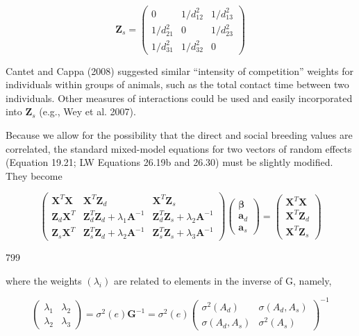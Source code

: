 \documentclass{article}
\begin{document}
\begin{equation}
\mathbf{Z}_{s}=\begin{pmatrix}0&1/d_{12}^{2}&1/d_{13}^{2}\\1/d_{21}^{2}&0&1/d_{23}^{2}\\1/d_{31}^{2}&1/d_{32}^{2}&0\end{pmatrix}
\end{equation}

Cantet and Cappa (2008) suggested similar “intensity of competition” weights for individuals within groups of animals, such as the total contact time between two individuals. Other measures of interactions could be used and easily incorporated into  $ \mathbf{Z}_{s} $ (e.g., Wey et al. 2007).

Because we allow for the possibility that the direct and social breeding values are correlated, the standard mixed-model equations for two vectors of random effects (Equation 19.21; LW Equations 26.19b and 26.30) must be slightly modified. They become

\begin{equation}
\begin{pmatrix}\mathbf{X}^{T}\mathbf{X}&\mathbf{X}^{T}\mathbf{Z}_{d}&\mathbf{X}^{T}\mathbf{Z}_{s}\\\mathbf{Z}_{d}\mathbf{X}^{T}&\mathbf{Z}_{d}^{T}\mathbf{Z}_{d}+\lambda_{1}\mathbf{A}^{-1}&\mathbf{Z}_{d}^{T}\mathbf{Z}_{s}+\lambda_{2}\mathbf{A}^{-1}\\\mathbf{Z}_{s}\mathbf{X}^{T}&\mathbf{Z}_{s}^{T}\mathbf{Z}_{d}+\lambda_{2}\mathbf{A}^{-1}&\mathbf{Z}_{s}^{T}\mathbf{Z}_{s}+\lambda_{3}\mathbf{A}^{-1}\end{pmatrix}\begin{pmatrix}\boldsymbol{\beta}\\\mathbf{a}_{d}\\\mathbf{a}_{s}\end{pmatrix}=\begin{pmatrix}\mathbf{X}^{T}\mathbf{X}\\\mathbf{X}^{T}\mathbf{Z}_{d}\\\mathbf{X}^{T}\mathbf{Z}_{s}\end{pmatrix}
\tag{22.40a}
\label{eq:22_40a}
\end{equation}

799

where the weights  $ \left(\lambda_{i}\right) $ are related to elements in the inverse of G, namely,

\begin{equation}
\begin{pmatrix}\lambda_{1}&\lambda_{2}\\\lambda_{2}&\lambda_{3}\end{pmatrix}=\sigma^{2}(e)\mathbf{G}^{-1}=\sigma^{2}(e)\begin{pmatrix}\sigma^{2}(A_{d})&\sigma(A_{d},A_{s})\\\sigma(A_{d},A_{s})&\sigma^{2}(A_{s})\end{pmatrix}^{-1}
\tag{22.40b}
\label{eq:22_40b}
\end{equation}
\end{document}

